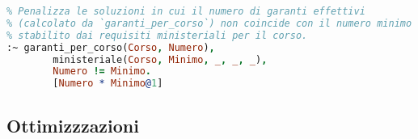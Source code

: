 \begin{lstlisting}[language=prolog, caption=Minimizzazione dei garanti per corso di laurea.]
% Vincolo debole per minimizzare il numero di garanti effettivi rispetto al minimo richiesto.
% Penalizza le soluzioni in cui il numero di garanti effettivi
% (calcolato da `garanti_per_corso`) non coincide con il numero minimo
% stabilito dai requisiti ministeriali per il corso.
:~ garanti_per_corso(Corso, Numero),
        ministeriale(Corso, Minimo, _, _, _),
        Numero != Minimo.
        [Numero * Minimo@1]
\end{lstlisting}

\subsection{Ottimizzzazioni}\label{sec:optimizations}